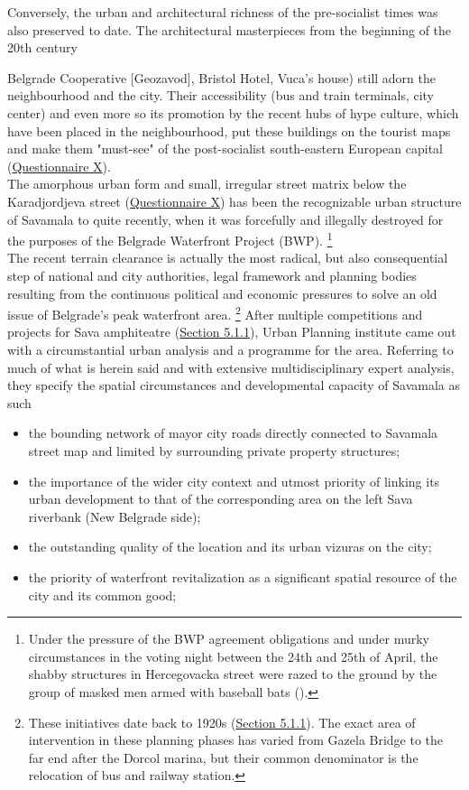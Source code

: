 \documentclass[11pt]{report}
\begin{document}
Conversely, the urban and architectural richness of the pre-socialist times was also preserved to date.
The architectural masterpieces from the beginning of the 20th century {Belgrade Cooperative [Geozavod], Bristol Hotel, Vuca's house) still adorn the neighbourhood and the city.
Their accessibility (bus and train terminals, city center) and even more so its promotion by the recent hubs of hype culture, which have been placed in the neighbourhood, put these buildings on the tourist maps and make them "must-see" of the post-socialist south-eastern European capital (\href{Questionnaire Experts Savamala}{Questionnaire X}).
\\

The amorphous urban form and small, irregular street matrix below the Karadjordjeva street (\href{Questionnaire PhD students}{Questionnaire X}) has been the recognizable urban structure of Savamala to quite recently, when it was forcefully and illegally destroyed for the purposes of the Belgrade Waterfront Project (BWP).
\footnote{Under the pressure of the BWP agreement obligations and under murky circumstances in the voting night between the 24th and 25th of April, the shabby structures in Hercegovacka street were razed to the ground by the group of masked men armed with baseball bats (\href{ref}{\citealt{popovic_porusili_2016}}).} %
\\

The recent terrain clearance is actually the most radical, but also consequential step of national and city authorities, legal framework and planning bodies resulting from the continuous political and economic pressures to solve an old issue of Belgrade’s peak waterfront area.
\footnote{These initiatives date back to 1920s (\href{Section 5.1.1}{Section 5.1.1}).
The exact area of intervention in these planning phases has varied from Gazela Bridge to the far end after the Dorcol marina, but their common denominator is the relocation of bus and railway station.}
After multiple competitions and projects for Sava amphiteatre (\href{Section 5.1.1}{Section 5.1.1}), Urban Planning institute came out with a circumstantial urban analysis and a programme for the area.
Referring to much of what is herein said and with extensive multidisciplinary expert analysis, they specify the spatial circumstances and developmental capacity of Savamala as such 

\begin{itemize}
\item the bounding network of mayor city roads directly connected to Savamala street map and limited by surrounding private property structures;
\item the importance of the wider city context and utmost priority of linking its urban development to that of the corresponding area on the left Sava riverbank (New Belgrade side);
\item the outstanding quality of the location and its urban vizuras on the city;
\item the priority of waterfront revitalization as a significant spatial resource of the city and its common good;
\end{itemize}

}
\end{document}
